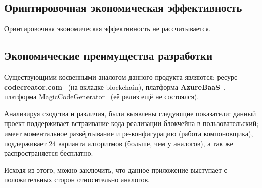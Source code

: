 \subsection{Оринтировочная экономическая эффективность}
Оринтировочная экономическая эффективность не рассчитывается.

\subsection{Экономические преимущества разработки}
Существующими косвенными аналогом данного продукта являются: ресурс
\textbf{codecreator.com}~\cite{CodeCreator} (на вкладке blockchain), платформа
\textbf{AzureBaaS}~\cite{MicrosoftAzure}, платформа
MagicCodeGenerator~\cite{mcg} (её релиз ещё не состоялся).

Анализируя сходства и различия, были выявлены следующие показатели: данный
проект поддерживает встраивание кода реализации блокчейна в пользовательский;
имеет моментальное развёртывание и ре-конфигурацию (работа компоновщика),
поддерживает 24 варианта алгоритмов (больше, чем у аналогов), а так же
распространяется бесплатно.

Исходя из этого, можно заключить, что данное приложение выступает с
положительных сторон относительно аналогов.
